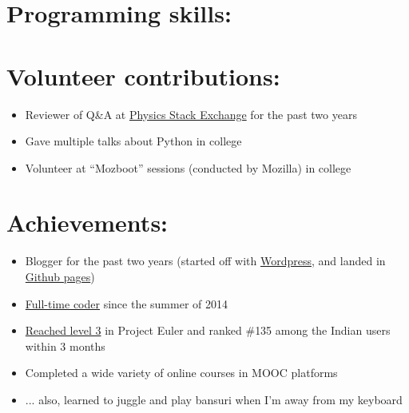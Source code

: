 \documentclass[11pt,a4paper,sans]{moderncv}        %
\newcommand\chref[3][linky]{\href{#2}{\color{#1}#3}}
\begin{document}
\section{Programming skills:}

\section{Volunteer contributions:}
\begin{itemize}
\item Reviewer of Q{\&}A at \chref{https://physics.stackexchange.com/users/11062/waffles-crazy-peanut}{Physics Stack Exchange} for the past two years
\item Gave multiple talks about Python in college
\item Volunteer at ``Mozboot'' sessions (conducted by Mozilla) in college
\end{itemize}

\section{Achievements:}
\begin{itemize}
\item Blogger for the past two years (started off with \chref{https://wafflescrazypeanut.wordpress.com/}{Wordpress}, and landed in \chref{https://wafflespeanut.github.io/}{Github pages})
\item \chref{https://github.com/Wafflespeanut}{Full-time coder} since the summer of 2014
\item \chref{https://projecteuler.net/profile/Wafflespeanut.png}{Reached level 3} in Project Euler and ranked {\#}135 among the Indian users within 3 months
\item Completed a wide variety of online courses in MOOC platforms
\item ... also, learned to juggle and play bansuri when I'm away from my keyboard
\end{itemize}

\end{document}

